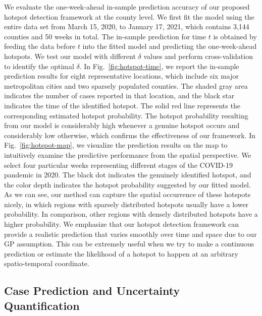 \documentclass[journal]{IEEEtran}
\begin{document}
We evaluate the one-week-ahead in-sample prediction accuracy of our proposed hotspot detection framework at the county level. We first fit the model using the entire data set from March 15, 2020, to January 17, 2021, which contains 3,144 counties and 50 weeks in total. The in-sample prediction for time $t$ is obtained by feeding the data before $t$ into the fitted model and predicting the one-week-ahead hotspots. 
We test our model with different $\delta$ values and perform cross-validation to identify the optimal $\delta$.
In Fig.~\ref{fig:hotspot-time}, we report the in-sample prediction results for eight representative locations, which include six major metropolitan cities and two sparsely populated counties. 
The shaded gray area indicates the number of cases reported in that location, and the black star indicates the time of the identified hotspot. 
The solid red line represents the corresponding estimated hotspot probability. 
The hotspot probability resulting from our model is considerably high whenever a genuine hotspot occurs and considerably low otherwise, which confirms the effectiveness of our framework. 
In Fig.~\ref{fig:hotspot-map}, we visualize the prediction results on the map to intuitively examine the predictive performance from the spatial perspective. 
We select four particular weeks representing different stages of the COVID-19 pandemic in 2020. The black dot indicates the genuinely identified hotspot, and the color depth indicates the hotspot probability suggested by our fitted model.
As we can see, our method can capture the spatial occurrence of these hotspots nicely, in which regions with sparsely distributed hotspots usually have a lower probability. In comparison, other regions with densely distributed hotspots have a higher probability. 
We emphasize that our hotspot detection framework can provide a realistic prediction that varies smoothly over time and space due to our GP assumption. 
This can be extremely useful when we try to make a continuous prediction or estimate the likelihood of a hotspot to happen at an arbitrary spatio-temporal coordinate. 

\subsection{Case Prediction and Uncertainty Quantification}
\end{document}
